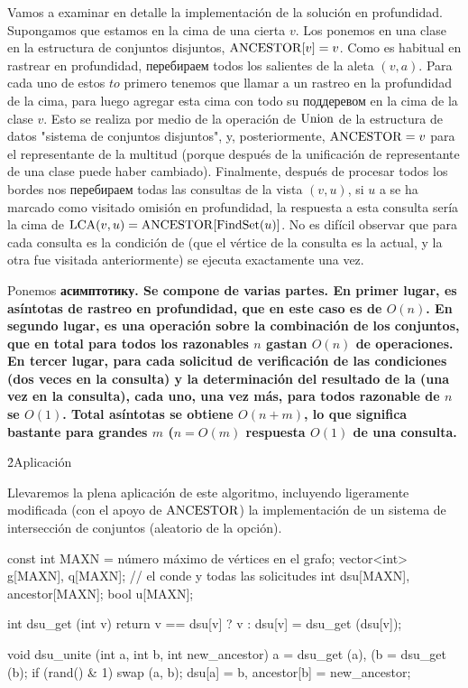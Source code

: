 Vamos a examinar en detalle la implementación de la solución en profundidad. Supongamos que estamos en la cima de una cierta $v$. Los ponemos en una clase en la estructura de conjuntos disjuntos, ${\rm ANCESTOR}[v] = v$. Como es habitual en rastrear en profundidad, перебираем todos los salientes de la aleta $(v, a)$. Para cada uno de estos $to$ primero tenemos que llamar a un rastreo en la profundidad de la cima, para luego agregar esta cima con todo su поддеревом en la cima de la clase $v$. Esto se realiza por medio de la operación de $\rm Union$ de la estructura de datos "sistema de conjuntos disjuntos", y, posteriormente, ${\rm ANCESTOR} = v$ para el representante de la multitud (porque después de la unificación de representante de una clase puede haber cambiado). Finalmente, después de procesar todos los bordes nos перебираем todas las consultas de la vista $(v,u)$, si $u$ a se ha marcado como visitado omisión en profundidad, la respuesta a esta consulta sería la cima de ${\rm LCA}(v,u) = {\rm ANCESTOR}[{\rm FindSet}(u)]$. No es difícil observar que para cada consulta es la condición de (que el vértice de la consulta es la actual, y la otra fue visitada anteriormente) se ejecuta exactamente una vez.

Ponemos \bf{асимптотику}. Se compone de varias partes. En primer lugar, es asíntotas de rastreo en profundidad, que en este caso es de $O(n)$. En segundo lugar, es una operación sobre la combinación de los conjuntos, que en total para todos los razonables $n$ gastan $O(n)$ de operaciones. En tercer lugar, para cada solicitud de verificación de las condiciones (dos veces en la consulta) y la determinación del resultado de la (una vez en la consulta), cada uno, una vez más, para todos razonable de $n$ se $O(1)$. Total asíntotas se obtiene $O(n+m)$, lo que significa bastante para grandes $m$ ($n = O(m)$ respuesta $O(1)$ de una consulta.

\h2{Aplicación}

Llevaremos la plena aplicación de este algoritmo, incluyendo ligeramente modificada (con el apoyo de $\rm ANCESTOR$) la implementación de un sistema de intersección de conjuntos (aleatorio de la opción).

\code
const int MAXN = número máximo de vértices en el grafo;
vector<int> g[MAXN], q[MAXN]; // el conde y todas las solicitudes
int dsu[MAXN], ancestor[MAXN];
bool u[MAXN];

int dsu_get (int v) {
return v == dsu[v] ? v : dsu[v] = dsu_get (dsu[v]);
}

void dsu_unite (int a, int b, int new_ancestor) {
a = dsu_get (a), (b = dsu_get (b);
if (rand() & 1) swap (a, b);
dsu[a] = b, ancestor[b] = new_ancestor;
}


